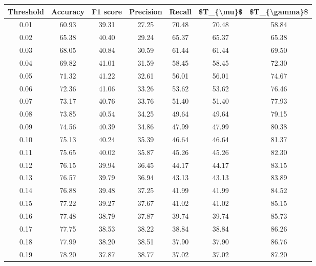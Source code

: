 \begin{tabular}{|c|c|c|c|c|c|c|}
\hline
 Threshold &  Accuracy &  F1 score &  Precision &  Recall &  \$T\_\{\textbackslash mu\}\$ &  \$T\_\{\textbackslash gamma\}\$ \\
\hline
      0.01 &     60.93 &     39.31 &      27.25 &   70.48 &      70.48 &         58.84 \\
      0.02 &     65.38 &     40.40 &      29.24 &   65.37 &      65.37 &         65.38 \\
      0.03 &     68.05 &     40.84 &      30.59 &   61.44 &      61.44 &         69.50 \\
      0.04 &     69.82 &     41.01 &      31.59 &   58.45 &      58.45 &         72.30 \\
      0.05 &     71.32 &     41.22 &      32.61 &   56.01 &      56.01 &         74.67 \\
      0.06 &     72.36 &     41.06 &      33.26 &   53.62 &      53.62 &         76.46 \\
      0.07 &     73.17 &     40.76 &      33.76 &   51.40 &      51.40 &         77.93 \\
      0.08 &     73.85 &     40.54 &      34.25 &   49.64 &      49.64 &         79.15 \\
      0.09 &     74.56 &     40.39 &      34.86 &   47.99 &      47.99 &         80.38 \\
      0.10 &     75.13 &     40.24 &      35.39 &   46.64 &      46.64 &         81.37 \\
      0.11 &     75.65 &     40.02 &      35.87 &   45.26 &      45.26 &         82.30 \\
      0.12 &     76.15 &     39.94 &      36.45 &   44.17 &      44.17 &         83.15 \\
      0.13 &     76.57 &     39.79 &      36.94 &   43.13 &      43.13 &         83.89 \\
      0.14 &     76.88 &     39.48 &      37.25 &   41.99 &      41.99 &         84.52 \\
      0.15 &     77.22 &     39.27 &      37.67 &   41.02 &      41.02 &         85.15 \\
      0.16 &     77.48 &     38.79 &      37.87 &   39.74 &      39.74 &         85.73 \\
      0.17 &     77.75 &     38.53 &      38.22 &   38.84 &      38.84 &         86.26 \\
      0.18 &     77.99 &     38.20 &      38.51 &   37.90 &      37.90 &         86.76 \\
      0.19 &     78.20 &     37.87 &      38.77 &   37.02 &      37.02 &         87.20 \\

\end{tabular}
